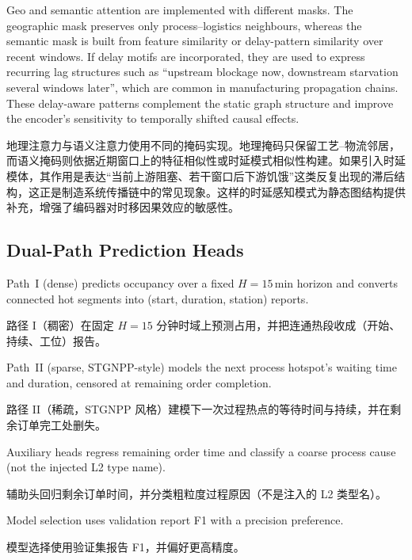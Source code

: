 \documentclass[12pt,a4paper,oneside,scheme=plain]{ctexrep}
\newcommand{\bip}[2]{%
  \par #1\par
  \nobreak\vspace{0.12em}%
  {\small\color{black!62}#2}\par
  \vspace{0.62em}%
}
\begin{document}
\bip
{Geo and semantic attention are implemented with different masks. The geographic mask preserves only process--logistics neighbours, whereas the semantic mask is built from feature similarity or delay-pattern similarity over recent windows. If delay motifs are incorporated, they are used to express recurring lag structures such as ``upstream blockage now, downstream starvation several windows later'', which are common in manufacturing propagation chains. These delay-aware patterns complement the static graph structure and improve the encoder's sensitivity to temporally shifted causal effects.}
{地理注意力与语义注意力使用不同的掩码实现。地理掩码只保留工艺--物流邻居，而语义掩码则依据近期窗口上的特征相似性或时延模式相似性构建。如果引入时延模体，其作用是表达“当前上游阻塞、若干窗口后下游饥饿”这类反复出现的滞后结构，这正是制造系统传播链中的常见现象。这样的时延感知模式为静态图结构提供补充，增强了编码器对时移因果效应的敏感性。}

\subsection[Dual-Path Prediction Heads / 双路径预测头]{Dual-Path Prediction Heads}
\label{sec:heads}

\bip
{Path~I (dense) predicts occupancy over a fixed $H=15$\,min horizon and converts connected hot segments into (start, duration, station) reports.}
{路径 I（稠密）在固定 $H=15$ 分钟时域上预测占用，并把连通热段收成（开始、持续、工位）报告。}

\bip
{Path~II (sparse, STGNPP-style) models the next process hotspot's waiting time and duration, censored at remaining order completion.}
{路径 II（稀疏，STGNPP 风格）建模下一次过程热点的等待时间与持续，并在剩余订单完工处删失。}

\bip
{Auxiliary heads regress remaining order time and classify a coarse process cause (not the injected L2 type name).}
{辅助头回归剩余订单时间，并分类粗粒度过程原因（不是注入的 L2 类型名）。}

\bip
{Model selection uses validation report F1 with a precision preference.}
{模型选择使用验证集报告 F1，并偏好更高精度。}
\end{document}
